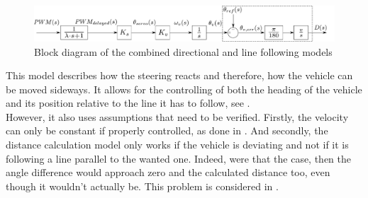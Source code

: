 \begin{figure}[H]
  \centering
  \includegraphics[width=1\textwidth]{figures/steeringModelWithLineFollowing.pdf}
  \caption{Block diagram of the combined directional and line following models}
  \label{fig:steeringLineFollowingModel}
\end{figure}

This model describes how the steering reacts and therefore, how the vehicle can be moved sideways. It allows for the controlling of both the heading of the vehicle and its position relative to the line it has to follow, see .\\
However, it also uses assumptions that need to be verified. Firstly, the velocity can only be constant if properly controlled, as done in . And secondly, the distance calculation model only works if the vehicle is deviating and not if it is following a line parallel to the wanted one. Indeed, were that the case, then the angle difference would approach zero and the calculated distance too, even though it wouldn't actually be. This problem is considered in .